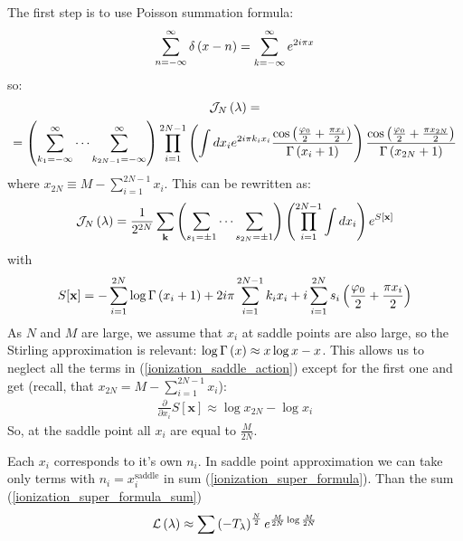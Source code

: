 The first step is to use Poisson summation formula:
\begin{gather}
	\sum_{n=-\infty}^\infty
	\delta\left(x - n\right)
	=
	\sum_{k=-\infty}^\infty
	e^{2i\pi x}
\end{gather} 
so:
\begin{multline}
	\mathcal{J}_N\left(\lambda\right)
	=
	\\
	=
	\left(
	\sum_{k_1=-\infty}^\infty
	\cdots
	\sum_{k_{2N-1}=-\infty}^\infty
	\right)
	\prod_{i=1}^{2N-1}
	\left(
	\int d x_i
	e^{2i \pi k_i x_i}
	\frac
		{	
			\cos
			\left(
				\frac{\varphi_0}{2}
				+
			\frac{\pi x_i}{2}
			\right)
		}
		{\Gamma\left(x_i+1\right)}
	\right)
	\frac
{
	\cos
	\left(
		\frac{\varphi_0}{2}
		+
		\frac{\pi x_{2N}}{2}
	\right)
}
{\Gamma\left(x_{2N}+1\right)}
\end{multline}
where $ x_{2N} \equiv M - \sum_{i=1}^{2N-1} x_i$. This can be rewritten as:
\begin{gather}
		\mathcal{J}_N\left(\lambda\right)
		=
		\frac{1}{2^{2N}}
		\sum_{\mathbf{k}}
		\left(
			\sum_{s_1=\pm 1}
			\cdots
			\sum_{s_{2N}=\pm1}
		\right)
	\left(
		\prod_{i=1}^{2N-1}
		\int
		d x_i
	\right)
	e^{S[\mathbf{x}]}
\end{gather}
with 
\begin{gather}
\label{ionization_saddle_action}
	S[\mathbf{x}]
	=
	-
	\sum_{i=1}^{2N}
	\log \Gamma\left(x_i+1\right)
	+
	2i\pi\sum_{i=1}^{2N-1}
	k_i x_i
	+
	i
	\sum_{i=1}^{2N}
	s_i
	\left(\frac{\varphi_0}{2}
	+
	\frac{\pi x_i}{2}	
	\right)
\end{gather}
As $ N $ and $ M $ are large, we assume that $ x_i $ at saddle points are also large, so the Stirling approximation is relevant: $\log \Gamma\left(x\right) \approx x\log x - x $. This allows us to neglect all the terms in (\ref{ionization_saddle_action}) except for the first one and get (recall, that $ x_{2N}
= M-\sum_{i=1}^{2N-1}x_i $):
\begin{gather}
	\frac{\partial}{\partial x_i}
	S[\mathbf{x}]
	\approx
	\log{x_{2N}}-\log{x_i}
\end{gather}
So, at the saddle point all $ x_i $ are equal to $ \frac{M}{2N} $. 

Each $ x_i $ corresponds to  it's own $ n_i $. In saddle point approximation we can take only terms with $ n_i = x_i^{\mathrm{saddle}} $ in sum (\ref{ionization_super_formula}). Than the sum (\ref{ionization_super_formula_sum}) 
\begin{gather}
	\mathcal{L}\left(\lambda\right)
	\approx
	\sum
	\left(-T_\lambda\right)^\frac{N}{2}
	e^{
		\frac{M}{2N}
		\log\frac{M}{2N}
	}
\end{gather}
